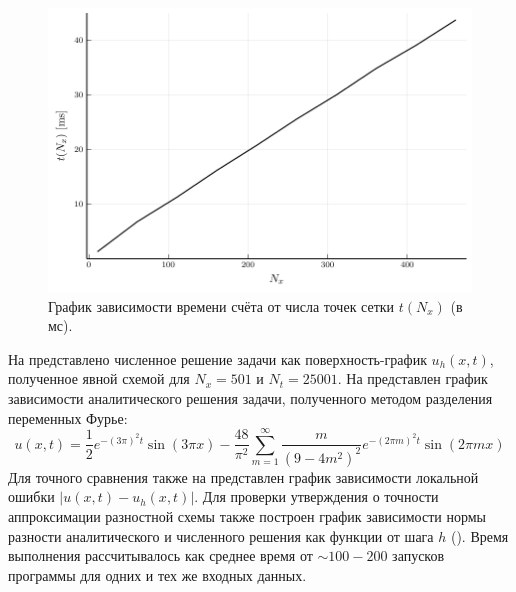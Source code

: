 \begin{figure}
    \centering
    \includegraphics{Разностные_схемы_на_статических_сетках/Программный_код_примеры_расчётов/explicit_scheme/problem_1_explicit_time.pdf}
    \caption{График зависимости времени счёта от числа точек сетки $t(N_x)$ (в мс).}
    \label{fig:problem_1_explicit_time}
\end{figure}
На  представлено численное решение задачи как поверхность-график $u_h(x, t)$, полученное явной схемой для $N_x = 501$ и $N_t = 25001$.
На  представлен график зависимости аналитического решения задачи, полученного методом разделения переменных Фурье:
\begin{equation*}
    u(x, t) = \frac{1}{2}e^{-(3\pi)^2 t}\sin (3\pi x) - \frac{48}{\pi^2}\sum\limits_{m=1}^{\infty} \frac{m}{(9 - 4m^2)^2}e^{-(2\pi m)^2 t}\sin (2\pi m x)
\end{equation*}
Для точного сравнения также на  представлен график зависимости локальной ошибки $|u(x, t) - u_h(x, t)|$.
Для проверки утверждения о точности аппроксимации разностной схемы также построен график зависимости нормы разности аналитического и численного решения как функции от шага $h$ ().
Время выполнения рассчитывалось как среднее время от $\sim 100-200$ запусков программы для одних и тех же входных данных.

